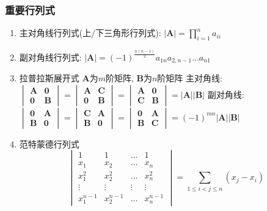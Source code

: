\subsubsection{重要行列式}
\begin{enumerate}
	\item 主对角线行列式(上/下三角形行列式): $ |\bm{A}|=\prod_{i=1}^{n}a_{ii} $
	\item 副对角线行列式: $ |\bm{A}|=(-1)^{\frac{n(n-1)}{2}}a_{1n}a_{2,n-1}...a_{n1} $
	\item 拉普拉斯展开式
	\subitem $ \bm{A} $为$ m $阶矩阵, $ \bm{B} $为$ n $阶矩阵
	\subitem 主对角线:
	$ \begin{vmatrix}
		\bm{A} & \bm{0} \\
		\bm{0} & \bm{B}
	\end{vmatrix} = \begin{vmatrix}
	\bm{A} & \bm{C} \\
	\bm{0} & \bm{B}
    \end{vmatrix} = \begin{vmatrix}
    \bm{A} & \bm{0} \\
    \bm{C} & \bm{B}
    \end{vmatrix} = |\bm{A}||\bm{B}|$
    \subitem 副对角线: 
    $ \begin{vmatrix}
    	\bm{0} & \bm{A} \\
    	\bm{B} & \bm{0}
    \end{vmatrix} = \begin{vmatrix}
    	\bm{C} & \bm{A} \\
    	\bm{B} & \bm{0}
    \end{vmatrix} = \begin{vmatrix}
    	\bm{0} & \bm{A} \\
    	\bm{B} & \bm{C}
    \end{vmatrix} = (-1)^{mn}|\bm{A}||\bm{B}|$
    \item 范特蒙德行列式
    \begin{equation*}
    	\begin{vmatrix}
    		1 & 1 & \dots & 1 \\
    		x_1 & x_2 & \dots & x_n \\
    		x_1^2 & x_2^2 & \dots & x_n^2 \\
    		\vdots & \vdots  & \vdots & \vdots \\
    		x_{1}^{n-1} & x_{2}^{n-1} & \dots & x_{n}^{n-1} 
    	\end{vmatrix} = \sum_{1\le i<j\le n}(x_{j}-x_{i})
    \end{equation*}
\end{enumerate} 
